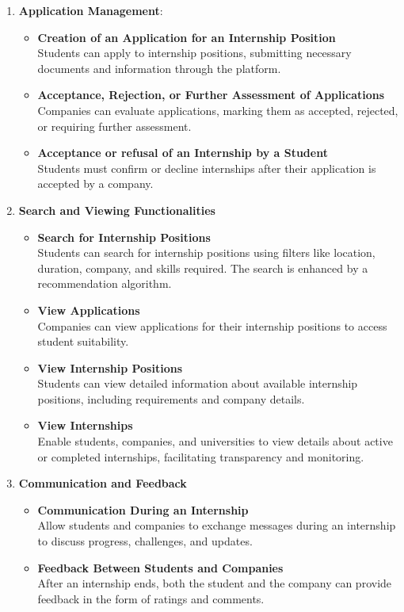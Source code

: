 \begin{enumerate}
    \item \textbf{Application Management}:
    \begin{itemize}
        \item \textbf{Creation of an Application for an Internship Position}
        \\Students can apply to internship positions, submitting necessary documents and information through the platform.
        \item \textbf{Acceptance, Rejection, or Further Assessment of Applications}
        \\Companies can evaluate applications, marking them as accepted, rejected, or requiring further assessment.
        \item \textbf{Acceptance or refusal of an Internship by a Student}
        \\Students must confirm or decline internships after their application is accepted by a company.
    \end{itemize}

    \item \textbf{Search and Viewing Functionalities}
    \begin{itemize}
        \item \textbf{Search for Internship Positions}
        \\Students can search for internship positions using filters like location, duration, company, and skills required.  The search is enhanced by a recommendation algorithm.
        \item \textbf{View Applications}
        \\Companies can view applications for their internship positions to access student suitability.
        \item \textbf{View Internship Positions}
        \\Students can view detailed information about available internship positions, including requirements and company details.
        \item \textbf{View Internships}
        \\Enable students, companies, and universities to view details about active or completed internships, facilitating transparency and monitoring.
    \end{itemize}

    \item \textbf{Communication and Feedback}
    \begin{itemize}
        \item \textbf{Communication During an Internship}
        \\Allow students and companies to exchange messages during an internship to discuss progress, challenges, and updates.
        \item \textbf{Feedback Between Students and Companies}
        \\After an internship ends, both the student and the company can provide feedback in the form of ratings and comments.
    \end{itemize}


\end{enumerate}
